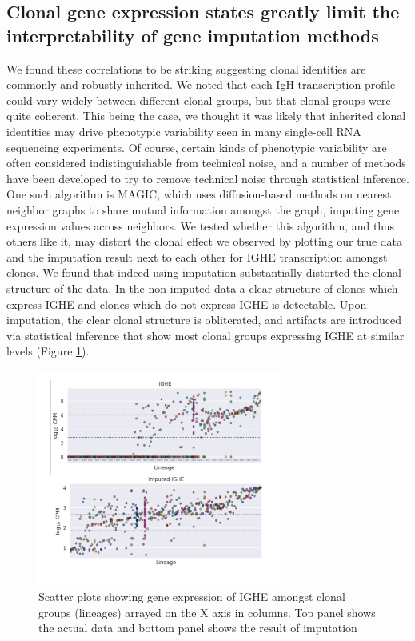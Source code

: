 \subsection{Clonal gene expression states greatly limit the interpretability of gene imputation methods}
We found these correlations to be striking suggesting clonal identities are commonly and robustly inherited. We noted that each IgH transcription profile could vary widely between different clonal groups, but that clonal groups were quite coherent. This being the case, we thought it was likely that inherited clonal identities may drive phenotypic variability seen in many single-cell RNA sequencing experiments. Of course, certain kinds of phenotypic variability are often considered indistinguishable from technical noise, and a number of methods have been developed to try to remove technical noise through statistical inference. One such algorithm is MAGIC\cite{van2018recovering}, which uses diffusion-based methods on nearest neighbor graphs to share mutual information amongst the graph, imputing gene expression values across neighbors. We tested whether this algorithm, and thus others like it, may distort the clonal effect we observed by plotting our true data and the imputation result next to each other for IGHE transcription amongst clones. We found that indeed using imputation substantially distorted the clonal structure of the data. In the non-imputed data a clear structure of clones which express IGHE and clones which do not express IGHE is detectable. Upon imputation, the clear clonal structure is obliterated, and artifacts are introduced via statistical inference that show most clonal groups expressing IGHE at similar levels (Figure \ref{fig:paper2_Imputation_limits}).  
\begin{figure}[htb!]
\centering
\includegraphics[width=8cm, keepaspectratio]{figs/prelim_InVitro/Imputation_limits.pdf}
\caption[Concordant switch transcription states amongst clones are clobbered by imputation]{Scatter plots showing gene expression of IGHE amongst clonal groups (lineages) arrayed on the X axis in columns. Top panel shows the actual data and bottom panel shows the result of imputation}
\label{fig:paper2_Imputation_limits}
\end{figure}
